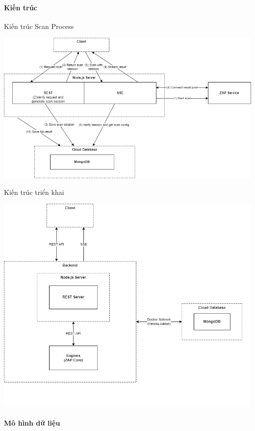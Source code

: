\paragraph{Kiến trúc}
\tab Kiến trúc Scan Process
\vspace{2cm}

\includegraphics[width=\textwidth]{images/diagram/diagram_25102022/Scan Process.png}

\newpage
Kiến trúc triển khai
\vspace{2cm}

\includegraphics[width=\textwidth]{images/diagram/diagram_25102022/ZAPOP Architecture.png}

\paragraph{Mô hình dữ liệu}
\vspace{2cm}

